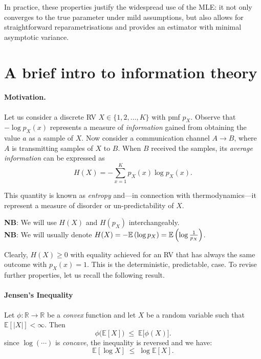 In practice, these properties justify the widespread use of the MLE: it not only converges to the true parameter under mild assumptions, but also allows for straightforward reparametrisations and provides an estimator with minimal asymptotic variance.

\section{A brief intro to information theory}
\label{sec:ch1_intro_to_InfTh}


\paragraph{Motivation.} Let us consider a discrete RV $X\in \{1,2,\ldots, K\}$ with pmf $p_X$.  Observe that $-\log p_X(x)$ represents a measure of \emph{information} gained from obtaining the value $a$ as a sample of $X$. Now consider a communication channel $A \to B$, where $A$ is transmitting samples of $X$ to $B$. When $B$ received the samples, its \emph{average information} can be expressed as 
\begin{equation}
	H(X) = -\sum_{x=1}^K p_X(x) \log p_X(x).
\end{equation}

This quantity is known as \emph{entropy} and---in connection with thermodynamics---it represent a measure of disorder or un-predictability of $X$. 

\textbf{NB}: We will use $H(X)$ and $H(p_X)$ interchangeably.\\
\textbf{NB}: We will usually denote $H(X) = -\mathbb{E} \left(\log p_X\right) = \mathbb{E} \left(\log\frac{1}{p_X}\right)$.



Clearly, $H(X)\geq0$ with equality achieved for an RV that has always the same outcome with $p_X(x)=1$. This is the deterministic, predictable, case.  To revise further properties, let us recall the following result. 

\paragraph{Jensen's Inequality}
Let $\phi:\mathbb{R}\rightarrow\mathbb{R}$ be a \emph{convex} function and let $X$ be a random variable such that $\mathbb{E}[|X|] < \infty$.
Then
\begin{equation}
	\phi\bigl(\mathbb{E}[X]\bigr) \;\le\; \mathbb{E}\bigl[\phi(X)\bigr].	
	\label{eq:Jensen_gral}
\end{equation}
since $\log(\cdots)$ is \emph{concave}, the inequality is reversed and we have: 
\begin{equation}
	\mathbb{E}[\log X] \;\le\; \log \mathbb{E}[X].	
	\label{eq:Jensen_log}
\end{equation}

